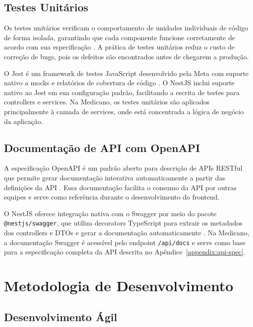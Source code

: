 \subsection{Testes Unitários}
\label{subsec:unit-tests}

Os testes unitários verificam o comportamento de
unidades individuais de código de forma isolada,
garantindo que cada componente funcione corretamente
de acordo com sua especificação \cite{sommerville2011}.
A prática de testes unitários reduz o custo de
correção de bugs, pois os defeitos são encontrados
antes de chegarem a produção.

O Jest é um framework de testes JavaScript desenvolvido
pela Meta com suporte nativo a mocks e relatórios de
cobertura de código \cite{jestjs2024}. O NestJS inclui
suporte nativo ao Jest em sua configuração padrão,
facilitando a escrita de testes para controllers e
services. Na Medicano, os testes unitários são
aplicados principalmente à camada de services, onde
está concentrada a lógica de negócio da aplicação.

\subsection{Documentação de API com OpenAPI}
\label{subsec:openapi}

A especificação OpenAPI é um padrão aberto para
descrição de APIs RESTful que permite gerar
documentação interativa automaticamente a partir
das definições da API \cite{swagger2021}. Essa
documentação facilita o consumo da API por outras
equipes e serve como referência durante o
desenvolvimento do frontend.

O NestJS oferece integração nativa com o Swagger
por meio do pacote \texttt{@nestjs/swagger}, que
utiliza decorators TypeScript para extrair os
metadados dos controllers e DTOs e gerar a
documentação automaticamente \cite{nestjs2024}.
Na Medicano, a documentação Swagger é acessível
pelo endpoint \texttt{/api/docs} e serve como
base para a especificação completa da API descrita
no Apêndice~\ref{appendix:api-spec}.

\section{Metodologia de Desenvolvimento}
\label{sec:dev-methodology}

\subsection{Desenvolvimento Ágil}
\label{subsec:agile}

